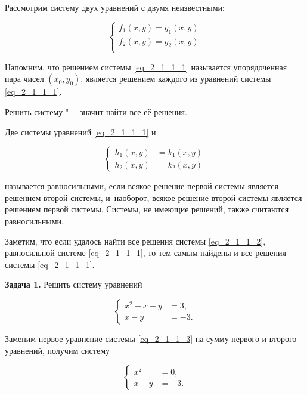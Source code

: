 Рассмотрим систему двух уравнений с двумя неизвестными:

\begin{equation}\label{eq_2_1_1_1}
\begin{cases}
f_{1}(x, y) = g_{1}(x, y) \\
f_{2}(x, y) = g_{2}(x, y) \\
\end{cases}
\end{equation}

Напомним. что решением системы \eqref{eq_2_1_1_1} называется упорядоченная пара
чисел $(x_{0}, y_{0})$, является решением каждого из уравнений системы \eqref{eq_2_1_1_1}.

Решить систему "--- значит найти все её решения.

Две системы уравнений \eqref{eq_2_1_1_1} и

\begin{equation}\label{eq_2_1_1_2}
\begin{cases}
h_{1}(x, y) &= k_{1}(x, y) \\
h_{2}(x, y) &= k_{2}(x, y)
\end{cases}
\end{equation}

называется равносильными, если всякое решение первой системы является решением
второй системы, и~наоборот, всякое решение второй системы является решением
первой системы. Системы, не имеющие решений, также считаются равносильными.

Заметим, что если удалось найти все решения системы \eqref{eq_2_1_1_2},
равносильной системе \eqref{eq_2_1_1_1}, то тем самым найдены и все решения
системы \eqref{eq_2_1_1_1}.

\textbf{Задача 1.} Решить систему уравнений

\begin{equation}\label{eq_2_1_1_3}
\begin{cases}
x^{2} - x + y &= 3, \\
        x - y &= -3.
\end{cases}
\end{equation}

Заменим первое уравнение системы \eqref{eq_2_1_1_3} на сумму первого и второго уравнений,
получим систему

\begin{equation}\label{eq_2_1_1_4}
\begin{cases}
x^{2} &= 0, \\
x - y &= -3.
\end{cases}
\end{equation}


